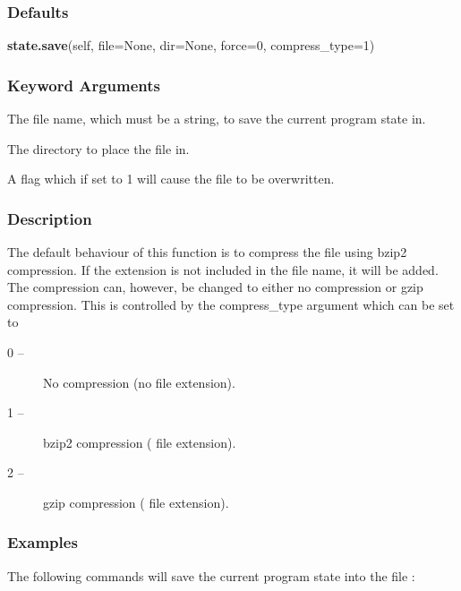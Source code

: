   
 \subsubsection{Defaults} 

 \textsf{\textbf{state.save}(self, file=None, dir=None, force=0, compress\_type=1)} 

  
 \subsubsection{Keyword Arguments} 

   The file name, which must be a string, to save the current program state in.   

   The directory to place the file in.   

   A flag which if set to 1 will cause the file to be overwritten.  

  

  
 \subsubsection{Description} 

 The default behaviour of this function is to compress the file using bzip2 compression.  If the extension  is not included in the file name, it will be added.  The compression can, however, be changed to either no compression or gzip compression.  This is controlled by the compress\_type argument which can be set to 
  

 \begin{description} 
 \item[0 --]  No compression (no file extension).  
 \item[1 --]  bzip2 compression ( file extension).  
 \item[2 --]  gzip compression ( file extension).  
 \end{description} 
  

  
 \subsubsection{Examples} 

 The following commands will save the current program state into the file : 
  

